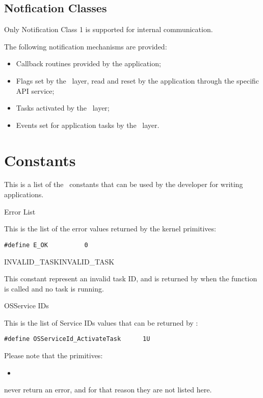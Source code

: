 \subsection{Notfication Classes}
Only Notification Class 1 is supported for internal communication. 

The following notification mechanisms are provided:
\begin{itemize}
\item Callback routines provided by the application;
\item Flags set by the \oc\ layer, read and reset by the application through the specific API service;
\item Tasks activated by the \oc\ layer;
\item Events set for application tasks by the \oc\ layer.
\end{itemize}


\pagebreak

\section{Constants}
\label{sec:constants}

This is a list of the \ee\ constants that can be used by the developer
for writing applications.

\begin{constant}{Error List}
  \begin{constantdescription}
    This is the list of the error values returned by the kernel primitives:
    \begin {lstlisting}
#define E_OK          0
    \end{lstlisting}
  \end{constantdescription}
\end{constant}

\begin{constant2}{INVALID\_TASK}{INVALID_TASK}
  \begin{constantdescription}
    This constant represent an invalid task ID, and is returned by
     when the function is called and no task is
    running.
  \end{constantdescription}
\end{constant2}

\begin{constant}{OSService IDs}
  \begin{constantdescription}
    This is the list of Service IDs values that can be returned by
    :
    \begin {lstlisting}
#define OSServiceId_ActivateTask      1U
    \end{lstlisting}
    Please note that the primitives:
    \begin{itemize}                              \vspace{-2mm}
      \item {}        \vspace{-2mm}
    \end{itemize}
    never return an error, and for that reason they are not listed
    here.
  \end{constantdescription}
\end{constant}

